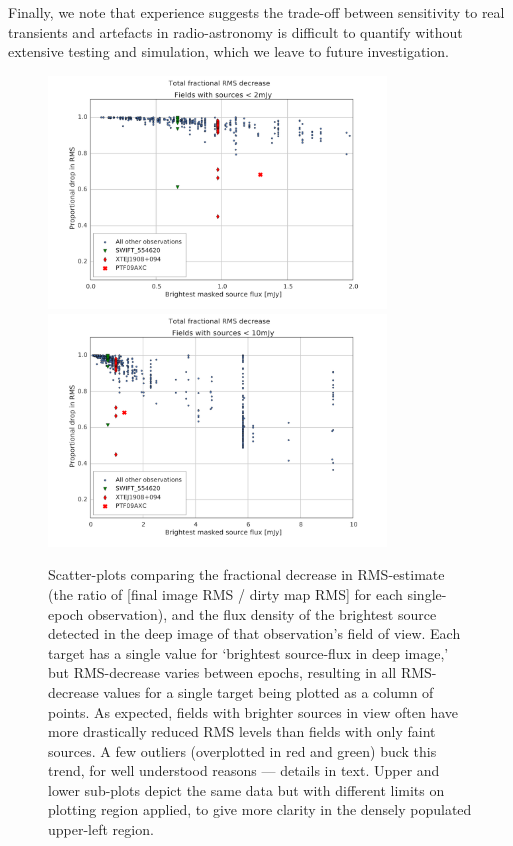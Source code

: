 \documentclass[5p,authoryear]{elsarticle}
\begin{document}
Finally, we note that experience suggests the trade-off between sensitivity to real transients and artefacts in radio-astronomy is difficult to quantify without extensive testing and simulation, which we leave to future investigation.

\begin{figure}[p]
\begin{center}  
  \includegraphics[width=0.8\textwidth]{../figures/rms_to_2mjy}
  \includegraphics[width=0.8\textwidth]{../figures/rms_to_10mjy}
  \caption[Fractional RMS decrease vs. brightest source flux]{%
  \label{fig:rms}
  Scatter-plots comparing the fractional decrease in RMS-estimate (the ratio of [final image RMS / dirty map RMS] for each single-epoch observation), and the flux density of the brightest source detected in the deep image of that observation's field of view. 
  Each target has a single value for `brightest source-flux in deep image,' but RMS-decrease varies between epochs, resulting in all RMS-decrease values for a single target being plotted as a column of points.
  As expected, fields with brighter sources in view often have more drastically reduced RMS levels than fields with only faint sources.
  A few outliers (overplotted in red and green) buck this trend, for well understood reasons --- details in text.
  Upper and lower sub-plots depict the same data but with different limits on plotting region applied, to give more clarity in the densely populated upper-left region.
} 
\end{center} 
\end{figure}
\end{document}
